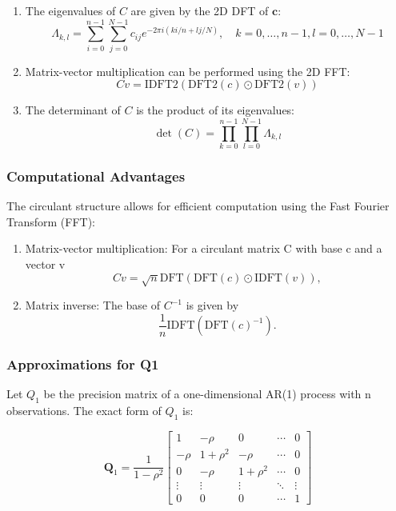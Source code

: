 \documentclass[journal=,manuscript=]{achemso}
\begin{document}
\begin{enumerate}
\def\labelenumi{\arabic{enumi}.}
\item
  The eigenvalues of \(C\) are given by the 2D DFT of \(\mathbf c\): \[
  \Lambda_{k,l} = \sum_{i=0}^{n-1} \sum_{j=0}^{N-1} c_{ij} e^{-2\pi i (ki/n + lj/N)}, \quad k = 0, \dots, n-1, l = 0, \dots, N-1
  \]
\item
  Matrix-vector multiplication can be performed using the 2D FFT: \[
  Cv = \text{IDFT2}(\text{DFT2}(c) \odot \text{DFT2}(v))
  \]
\item
  The determinant of \(C\) is the product of its eigenvalues: \[
  \det(C) = \prod_{k=0}^{n-1} \prod_{l=0}^{N-1} \Lambda_{k,l}
  \]
\end{enumerate}

\subsubsection{Computational Advantages}\label{computational-advantages}

The circulant structure allows for efficient computation using the Fast
Fourier Transform (FFT):

\begin{enumerate}
\def\labelenumi{\arabic{enumi}.}
\item
  Matrix-vector multiplication: For a circulant matrix C with base c and
  a vector v \[
  Cv = \sqrt{n} \text{DFT}(\text{DFT}(c) \odot \text{IDFT}(v)),
  \]
\item
  Matrix inverse: The base of \(C^{-1}\) is given by \[
  \frac{1}{n} \text{IDFT}(\text{DFT}(c)^{-1}).
  \]
\end{enumerate}

\subsubsection{Approximations for Q1}\label{approximations-for-q1}

Let \(Q_1\) be the precision matrix of a one-dimensional AR(1) process
with n observations. The exact form of \(Q_1\) is:

\[
\mathbf{Q}_1 = \frac{1}{1-\rho^2}
\begin{bmatrix}
1 & -\rho & 0 & \cdots & 0 \\
-\rho & 1+\rho^2 & -\rho & \cdots & 0 \\
0 & -\rho & 1+\rho^2 & \cdots & 0 \\
\vdots & \vdots & \vdots & \ddots & \vdots \\
0 & 0 & 0 & \cdots & 1
\end{bmatrix}
\]
\end{document}
